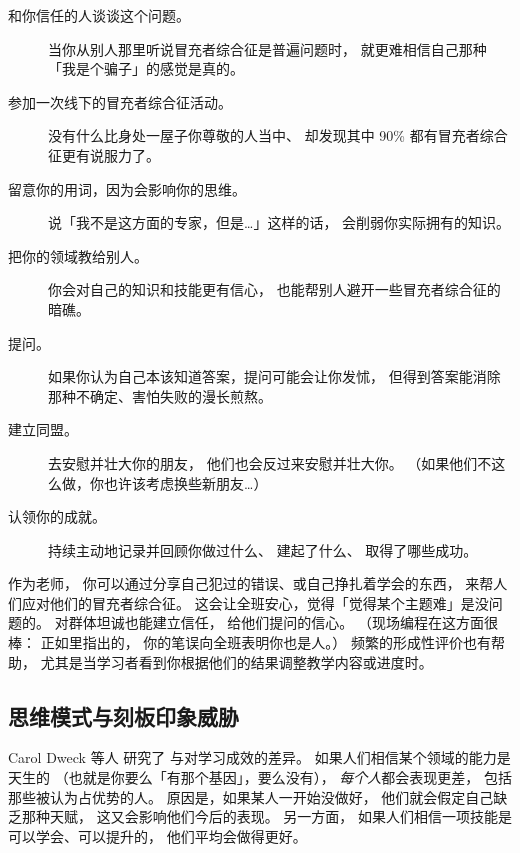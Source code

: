 \begin{description}

\item[和你信任的人谈谈这个问题。]
  当你从别人那里听说冒充者综合征是普遍问题时，
  就更难相信自己那种「我是个骗子」的感觉是真的。

\item[参加一次线下的冒充者综合征活动。]
  没有什么比身处一屋子你尊敬的人当中、
  却发现其中 90\% 都有冒充者综合征更有说服力了。

\item[留意你的用词，因为会影响你的思维。]
  说「我不是这方面的专家，但是{\ldots}」这样的话，
  会削弱你实际拥有的知识。

\item[把你的领域教给别人。]
  你会对自己的知识和技能更有信心，
  也能帮别人避开一些冒充者综合征的暗礁。

\item[提问。]
  如果你认为自己本该知道答案，提问可能会让你发怵，
  但得到答案能消除那种不确定、害怕失败的漫长煎熬。

\item[建立同盟。]
  去安慰并壮大你的朋友，
  他们也会反过来安慰并壮大你。
  （如果他们不这么做，你也许该考虑换些新朋友{\ldots}）

\item[认领你的成就。]
  持续主动地记录并回顾你做过什么、
  建起了什么、
  取得了哪些成功。

\end{description}

作为老师，
你可以通过分享自己犯过的错误、或自己挣扎着学会的东西，
来帮人们应对他们的冒充者综合征。
这会让全班安心，觉得「觉得某个主题难」是没问题的。
对群体坦诚也能建立信任，
给他们提问的信心。
（现场编程在这方面很棒：
正如里指出的，
你的笔误向全班表明你也是人。）
频繁的形成性评价也有帮助，
尤其是当学习者看到你根据他们的结果调整教学内容或进度时。

\subsection*{思维模式与刻板印象威胁}

Carol Dweck 等人
研究了
与对学习成效的差异。
如果人们相信某个领域的能力是天生的
（也就是你要么「有那个基因」，要么没有），
\emph{每个人}都会表现更差，
包括那些被认为占优势的人。
原因是，如果某人一开始没做好，
他们就会假定自己缺乏那种天赋，
这又会影响他们今后的表现。
另一方面，
如果人们相信一项技能是可以学会、可以提升的，
他们平均会做得更好。

